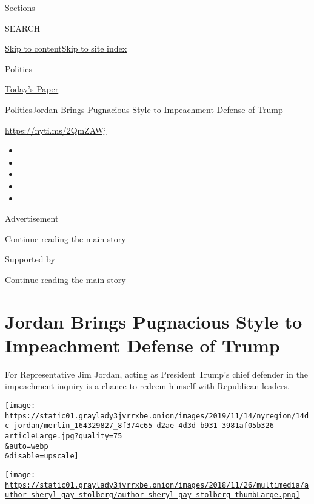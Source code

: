 Sections

SEARCH

\protect\hyperlink{site-content}{Skip to
content}\protect\hyperlink{site-index}{Skip to site index}

\href{https://www.nytimes3xbfgragh.onion/section/politics}{Politics}

\href{https://myaccount.nytimes3xbfgragh.onion/auth/login?response_type=cookie\&client_id=vi}{}

\href{https://www.nytimes3xbfgragh.onion/section/todayspaper}{Today's
Paper}

\href{/section/politics}{Politics}\textbar{}Jordan Brings Pugnacious
Style to Impeachment Defense of Trump

\url{https://nyti.ms/2QmZAWj}

\begin{itemize}
\item
\item
\item
\item
\item
\end{itemize}

Advertisement

\protect\hyperlink{after-top}{Continue reading the main story}

Supported by

\protect\hyperlink{after-sponsor}{Continue reading the main story}

\hypertarget{jordan-brings-pugnacious-style-to-impeachment-defense-of-trump}{%
\section{Jordan Brings Pugnacious Style to Impeachment Defense of
Trump}\label{jordan-brings-pugnacious-style-to-impeachment-defense-of-trump}}

For Representative Jim Jordan, acting as President Trump's chief
defender in the impeachment inquiry is a chance to redeem himself with
Republican leaders.

\texttt{[image: https://static01.graylady3jvrrxbe.onion/images/2019/11/14/nyregion/14dc-jordan/merlin\_164329827\_8f374c65-d2ae-4d3d-b931-3981af05b326-articleLarge.jpg?quality=75\\\&auto=webp\\\&disable=upscale]}

\href{https://www.nytimes3xbfgragh.onion/by/sheryl-gay-stolberg}{\texttt{[image: https://static01.graylady3jvrrxbe.onion/images/2018/11/26/multimedia/author-sheryl-gay-stolberg/author-sheryl-gay-stolberg-thumbLarge.png]}}

